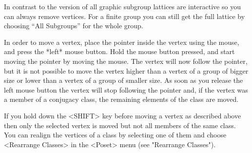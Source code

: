 In contrast to the {} version of {\XGAP} all graphic subgroup lattices 
are interactive so you can always remove vertices. For a finite group you 
can still get the full lattice by choosing ``All Subgroups'' for the whole 
group.

%







In order to move a vertex, place the  pointer inside the vertex using the
mouse, and press the *left* mouse button.  Hold the mouse button pressed,
and start moving  the pointer by moving  the mouse.  The  vertex will now
follow the pointer, but it is not possible to move the vertex higher than
a vertex  of a group of bigger size  
or lower than a vertex of a group of smaller
size.
As soon as you release the left mouse
button the vertex will stop following the pointer  and, if the vertex was
a member of a  conjugacy class, the remaining elements  of the class  are
moved.

If you hold  down  the <SHIFT> key before  moving  a vertex as  described
above then  only the selected vertex is moved but not all members of the
same class. You can realign the vertices of a class by selecting one of
them and choose <Rearrange Classes> in the <Poset> menu 
(see "Rearrange Classes").

